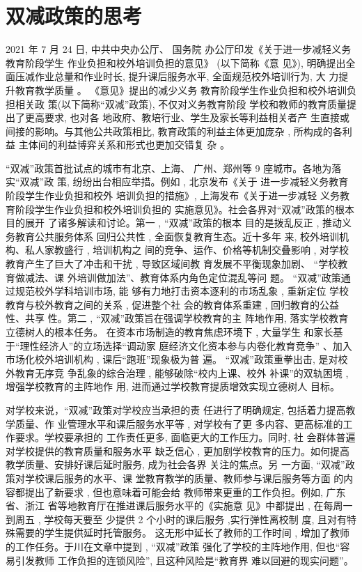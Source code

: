 \documentclass[a4paper]{book}
\numberwithin{equation}{chapter}
\theoremstyle{definition}
\begin{document}
\pagestyle{plain}
\setcounter{page}{1}
\section*{\centering \huge 双减政策的思考}

2021 年 7 月 24 日,
中共中央办公厅、
国务院
办公厅印发《关于进一步减轻义务教育阶段学生
作业负担和校外培训负担的意见》
(以下简称《意
见》),
明确提出全面压减作业总量和作业时长,
提升课后服务水平,
全面规范校外培训行为,
大
力提升教育教学质量
。
《意见》提出的减少义务
教育阶段学生作业负担和校外培训负担相关政
策(以下简称“双减”政策),
不仅对义务教育阶段
学校和教师的教育质量提出了更高要求,
也对各
地政府、教培行业、学生及家长等利益相关者产
生直接或间接的影响。与其他公共政策相比,
教育政策的利益主体更加庞杂 ,
所构成的各利益
主体间的利益博弈关系和形式也更加交错复
杂 。

“双减”政策首批试点的城市有北京、上海、
广州、郑州等 9 座城市。各地为落实“双减”政
策,
纷纷出台相应举措。例如 ,
北京发布《关于
进一步减轻义务教育阶段学生作业负担和校外
培训负担的措施》,
上海发布《关于进一步减轻
义务教育阶段学生作业负担和校外培训负担的
实施意见》。社会各界对“双减”政策的根本目的展开
了诸多解读和讨论。第一 ,
“双减”政策的根本
目的是拨乱反正 ,
推动义务教育公共服务体系
回归公共性\cite{ref1} ,
全面恢复教育生态。近十多年
来,
校外培训机构、私人家教盛行 ,
培训机构之
间的竞争、运作、价格等机制交叠影响 ,
对学校
教育产生了巨大了冲击和干扰 ,
导致区域间教
育发展不平衡现象加剧、
“学校教育做减法、课
外培训做加法”、教育体系内角色定位混乱等问
题。
“双减”政策通过规范校外学科培训市场,
能
够有力地打击资本逐利的市场乱象 ,
重新定位
学校教育与校外教育之间的关系 ,
促进整个社
会的教育体系重建 ,
回归教育的公益性、共享
性\cite{ref2}。第二 ,
“双减”政策旨在强调学校教育的主
阵地作用,
落实学校教育立德树人的根本任务。
在资本市场制造的教育焦虑环境下 ,
大量学生
和家长基于“理性经济人”的立场选择“调动家
庭经济文化资本参与内卷化教育竞争” 、加入
市场化校外培训机构 ,
课后“跑班”现象极为普
遍。
“双减”政策重拳出击,
是对校外教育无序竞
争乱象的综合治理 ,
能够破除“校内上课、校外
补课”的双轨困境 ,增强学校教育的主阵地作
用,
进而通过学校教育提质增效实现立德树人
目标。


对学校来说，“双减”政策对学校应当承担的责
任进行了明确规定,
包括着力提高教学质量、作
业管理水平和课后服务水平等 ,
对学校有了更
多内容、更高标准的工作要求。学校要承担的
工作责任更多,
面临更大的工作压力。同时,
社
会群体普遍对学校提供的教育质量和服务水平
缺乏信心 ,
更加剧学校教育的压力。如何提高
教学质量、安排好课后延时服务,
成为社会各界
关注的焦点。另
一方面,
“双减”政策对学校课后服务的水平、课
堂教育教学的质量、教师参与课后服务等方面
的内容都提出了新要求 ,
但也意味着可能会给
教师带来更重的工作负担。例如,
广东省、浙江
省等地教育厅在推进课后服务水平的《实施意
见》中都提出 ,
在每周一到周五 ,
学校每天要至
少提供 2 个小时的课后服务 ,实行弹性离校制
度,
且对有特殊需要的学生提供延时托管服务。
这无形中延长了教师的工作时间 ,
增加了教师
的工作任务。于川在文章中提到 ,
“双减”政策
强化了学校的主阵地作用,
但也“容易引发教师
工作负担的连锁风险”,
且这种风险是“教育界
难以回避的现实问题”。\cite{ref3}
\end{document}
